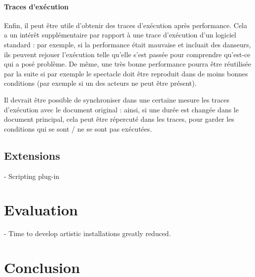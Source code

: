 \documentclass{sigchi}
\begin{document}
\paragraph{Traces d'exécution}
Enfin, il peut être utile d'obtenir des traces d'exécution après performance. Cela a un intérêt supplémentaire par rapport à une trace d'exécution d'un logiciel standard : par exemple, si la performance était mauvaise et incluait des danseurs, ils peuvent rejouer l'exécution telle qu'elle s'est passée pour comprendre qu'est-ce qui a posé problème. De même, une très bonne performance pourra être réutilisée par la suite si par exemple le spectacle doit être reproduit dans de moins bonnes conditions (par exemple si un des acteurs ne peut être présent).

Il devrait être possible de synchroniser dans une certaine mesure les traces d'exécution avec le document original : ainsi, si une durée est changée dans le document principal, cela peut être répercuté dans les traces, pour garder les conditions qui se sont / ne se sont pas exécutées.


\subsection{Extensions}
- Scripting plug-in

\section{Evaluation}
- Time to develop artistic installations greatly reduced.

\section{Conclusion}



\end{document}
